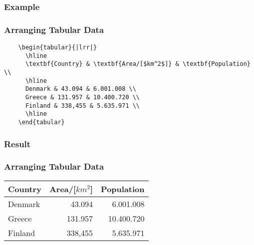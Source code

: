 \subsubsection{Example}
\begin{frame}[fragile]
  \frametitle{Arranging Tabular Data }
  \vspace{16mm}
  \begin{verbatim}
    \begin{tabular}{|lrr|}
      \hline
      \textbf{Country} & \textbf{Area/[$km^2$]} & \textbf{Population} \\
      \hline
      Denmark & 43.094 & 6.001.008 \\
      Greece & 131.957 & 10.400.720 \\
      Finland & 338,455 & 5.635.971 \\
      \hline
    \end{tabular}
  \end{verbatim}
\end{frame}

\subsubsection{Result}
\begin{frame}[fragile]
  \frametitle{Arranging Tabular Data }
  \vspace{24mm}
  \begin{center}
    \begin{tabular}{|lrr|}
      \hline
      \textbf{Country} & \textbf{Area/[$km^2$]} & \textbf{Population} \\
      \hline
      Denmark & 43.094 & 6.001.008 \\
      Greece & 131.957 & 10.400.720 \\
      Finland & 338,455 & 5.635.971 \\
      \hline
    \end{tabular}
  \end{center}
\end{frame}

